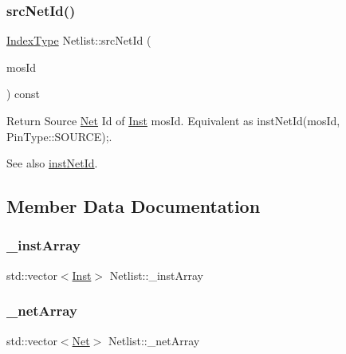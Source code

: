 \subsubsection{\texorpdfstring{src\+Net\+Id()}{srcNetId()}}
{\footnotesize\ttfamily \hyperlink{type_8h_a581e8093e28e7362f2b6937296190676}{Index\+Type} Netlist\+::src\+Net\+Id (\begin{DoxyParamCaption}\item[{\hyperlink{type_8h_a581e8093e28e7362f2b6937296190676}{Index\+Type}}]{mos\+Id }\end{DoxyParamCaption}) const\hspace{0.3cm}{\ttfamily [inline]}}



Return Source \hyperlink{classNet}{Net} Id of \hyperlink{classInst}{Inst} mos\+Id. Equivalent as inst\+Net\+Id(mos\+Id, Pin\+Type\+::\+S\+O\+U\+R\+C\+E);. 

\begin{DoxySeeAlso}{See also}
\hyperlink{classNetlist_af7ac6daa5f0f66a60c71b69a1d8fd670}{inst\+Net\+Id}. 
\end{DoxySeeAlso}


\subsection{Member Data Documentation}
\mbox{\label{classNetlist_a301a0c44a335af1bc3af743f645eae9e}} 
\subsubsection{\texorpdfstring{\+\_\+inst\+Array}{\_instArray}}
{\footnotesize\ttfamily std\+::vector$<$\hyperlink{classInst}{Inst}$>$ Netlist\+::\+\_\+inst\+Array\hspace{0.3cm}{\ttfamily [private]}}

\mbox{\label{classNetlist_a88ad89f8acc15d2971b0689adaad8704}} 
\subsubsection{\texorpdfstring{\+\_\+net\+Array}{\_netArray}}
{\footnotesize\ttfamily std\+::vector$<$\hyperlink{classNet}{Net}$>$ Netlist\+::\+\_\+net\+Array\hspace{0.3cm}{\ttfamily [private]}}

